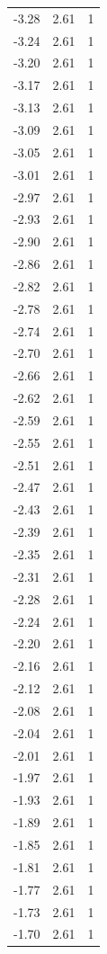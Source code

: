 \begin{longtable}{lrr}
  -3.28 & 2.61 & 1 \\
  -3.24 & 2.61 & 1 \\
  -3.20 & 2.61 & 1 \\
  -3.17 & 2.61 & 1 \\
  -3.13 & 2.61 & 1 \\
  -3.09 & 2.61 & 1 \\
  -3.05 & 2.61 & 1 \\
  -3.01 & 2.61 & 1 \\
  -2.97 & 2.61 & 1 \\
  -2.93 & 2.61 & 1 \\
  -2.90 & 2.61 & 1 \\
  -2.86 & 2.61 & 1 \\
  -2.82 & 2.61 & 1 \\
  -2.78 & 2.61 & 1 \\
  -2.74 & 2.61 & 1 \\
  -2.70 & 2.61 & 1 \\
  -2.66 & 2.61 & 1 \\
  -2.62 & 2.61 & 1 \\
  -2.59 & 2.61 & 1 \\
  -2.55 & 2.61 & 1 \\
  -2.51 & 2.61 & 1 \\
  -2.47 & 2.61 & 1 \\
  -2.43 & 2.61 & 1 \\
  -2.39 & 2.61 & 1 \\
  -2.35 & 2.61 & 1 \\
  -2.31 & 2.61 & 1 \\
  -2.28 & 2.61 & 1 \\
  -2.24 & 2.61 & 1 \\
  -2.20 & 2.61 & 1 \\
  -2.16 & 2.61 & 1 \\
  -2.12 & 2.61 & 1 \\
  -2.08 & 2.61 & 1 \\
  -2.04 & 2.61 & 1 \\
  -2.01 & 2.61 & 1 \\
  -1.97 & 2.61 & 1 \\
  -1.93 & 2.61 & 1 \\
  -1.89 & 2.61 & 1 \\
  -1.85 & 2.61 & 1 \\
  -1.81 & 2.61 & 1 \\
  -1.77 & 2.61 & 1 \\
  -1.73 & 2.61 & 1 \\
  -1.70 & 2.61 & 1 \\

\end{longtable}

